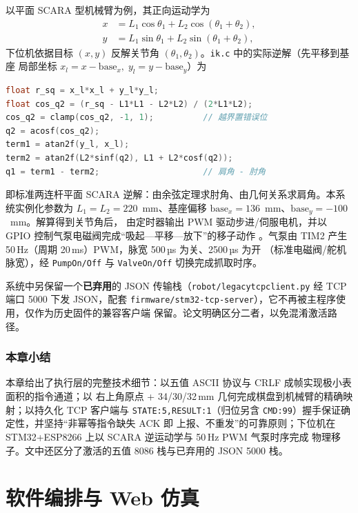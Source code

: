 \documentclass[UTF8, a4paper, 11pt, openany]{ctexbook}
\renewcommand{\_}{\textunderscore\allowbreak}
\begin{document}
以平面 SCARA 型机械臂为例，其正向运动学为
\begin{equation}
\label{eq:fk}
\begin{aligned}
x &= L_1\cos\theta_1 + L_2\cos(\theta_1+\theta_2), \\
y &= L_1\sin\theta_1 + L_2\sin(\theta_1+\theta_2),
\end{aligned}
\end{equation}
下位机依据目标 $(x,y)$ 反解关节角 $(\theta_1,\theta_2)$。\texttt{ik.c} 中的实际逆解（先平移到基座
局部坐标 $x_l=x-\text{base}_x,\;y_l=y-\text{base}_y$）为
\begin{lstlisting}[language=C, caption={SCARA 逆运动学（节选自 firmware/stm32-f103-keil-robot/ik.c）}]
float r_sq = x_l*x_l + y_l*y_l;
float cos_q2 = (r_sq - L1*L1 - L2*L2) / (2*L1*L2);
cos_q2 = clamp(cos_q2, -1, 1);          // 越界置错误位
q2 = acosf(cos_q2);
term1 = atan2f(y_l, x_l);
term2 = atan2f(L2*sinf(q2), L1 + L2*cosf(q2));
q1 = term1 - term2;                     // 肩角 - 肘角
\end{lstlisting}
即标准两连杆平面 SCARA 逆解：由余弦定理求肘角、由几何关系求肩角。本系统实例化参数为
$L_1=L_2=220$~mm、基座偏移 $\text{base}_x=136$~mm、$\text{base}_y=-100$~mm。解算得到关节角后，
由定时器输出 PWM 驱动步进/伺服电机，并以 GPIO 控制气泵电磁阀完成“吸起—平移—放下”的移子动作
\cite{craig2017robotics}。气泵由 TIM2 产生 50\,Hz（周期 20\,ms）PWM，脉宽 500\,µs 为关、2500\,µs 为开
（标准电磁阀/舵机脉宽），经 \texttt{Pump\_On/Off} 与 \texttt{Valve\_On/Off} 切换完成抓取时序。

系统中另保留一个\textbf{已弃用}的 JSON 传输栈（\texttt{robot/legacy\_tcp\_client.py} 经 TCP 端口 5000
下发 JSON，配套 \texttt{firmware/stm32-tcp-server}），它不再被主程序使用，仅作为历史固件的兼容客户端
保留。论文明确区分二者，以免混淆激活路径。

\subsection*{本章小结}
本章给出了执行层的完整技术细节：以五值 ASCII 协议与 CRLF 成帧实现极小表面积的指令通道；以
右上角原点 + 34/30/32\,mm 几何完成棋盘到机械臂的精确映射；以持久化 TCP 客户端与
\texttt{STATE:5,RESULT:1}（归位另含 \texttt{CMD:99}）握手保证确定性，并坚持“非幂等指令缺失 ACK 即
上报、不重发”的可靠原则；下位机在 STM32+ESP8266 上以 SCARA 逆运动学与 50\,Hz PWM 气泵时序完成
物理移子。文中还区分了激活的五值 8086 栈与已弃用的 JSON 5000 栈。

\chapter{软件编排与 Web 仿真}
\label{ch:web}
\end{document}
